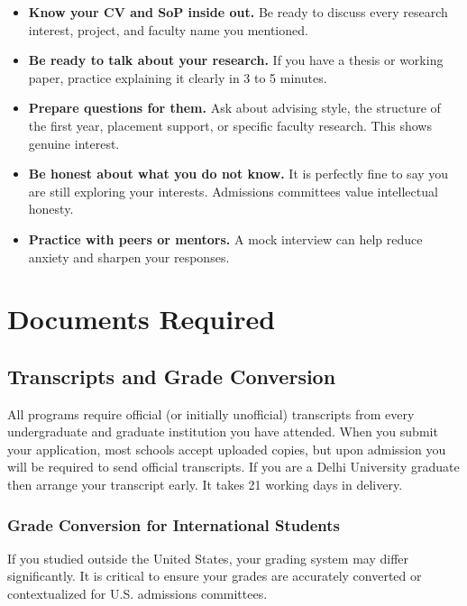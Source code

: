 \documentclass[11pt, letterpaper]{article}
\begin{document}
\begin{itemize}[leftmargin=*, itemsep=2pt]
    \item \textbf{Know your CV and SoP inside out.} Be ready to discuss every research interest, project, and faculty name you mentioned.
    \item \textbf{Be ready to talk about your research.} If you have a thesis or working paper, practice explaining it clearly in 3 to 5 minutes.
    \item \textbf{Prepare questions for them.} Ask about advising style, the structure of the first year, placement support, or specific faculty research. This shows genuine interest.
    \item \textbf{Be honest about what you do not know.} It is perfectly fine to say you are still exploring your interests. Admissions committees value intellectual honesty.
    \item \textbf{Practice with peers or mentors.} A mock interview can help reduce anxiety and sharpen your responses.
\end{itemize}


\section{Documents Required}\label{sec:documents}

\subsection{Transcripts and Grade Conversion}\label{sec:transcripts}

All programs require official (or initially unofficial) transcripts from every undergraduate and graduate institution you have attended. When you submit your application, most schools accept uploaded copies, but upon admission you will be required to send official transcripts.
If you are a Delhi University graduate then arrange your transcript early. It takes 21 working days in delivery. 

\subsubsection*{Grade Conversion for International Students}

If you studied outside the United States, your grading system may differ significantly. It is critical to ensure your grades are accurately converted or contextualized for U.S. admissions committees.
\end{document}
